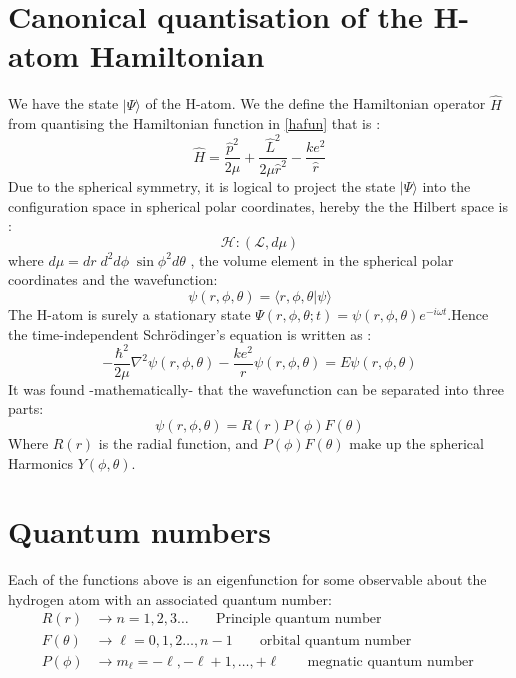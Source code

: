 \section{Canonical quantisation of the H-atom  Hamiltonian }
We have the state $ | \Psi\rangle$ of the H-atom. We the define the Hamiltonian operator $ \hat H$ from quantising the Hamiltonian function in \eqref{hafun} that is :
\begin{equation}
\hat H = \frac{\hat p^2}{2 \mu}+ \frac{\hat L^2}{2\mu \hat r^2} - \frac{k e^2}{\hat r}
\label{haop}
\end{equation}
Due to the spherical symmetry, it is logical to project the state $ | \Psi\rangle$  into the configuration space in spherical polar coordinates, hereby the the Hilbert space is :
\[
\mathcal{H} : ( \mathcal{L} , d\mu)
\]
where $ d\mu = dr\;d^2 d\phi \; \sin\phi ^2 d\theta$ , the volume element in the spherical polar coordinates and the wavefunction:
\[
\psi (r, \phi, \theta) = \langle r, \phi,\theta | \psi \rangle
\]
The H-atom is surely a stationary state $ \Psi(r, \phi, \theta;t) = \psi (r, \phi, \theta) e^{ -i\omega t}$.Hence the time-independent Schr\"{o}dinger's equation is written as :
\begin{equation}
-\frac{\hbar ^2}{2 \mu} \nabla^2 \psi (r, \phi, \theta) - \frac{k e^2}{r} \psi (r, \phi, \theta) = E \psi (r, \phi, \theta)
\label{TISE}
\end{equation}
It was found -mathematically- that the wavefunction can be separated into three parts:
\begin{equation}
\psi (r, \phi, \theta) = R(r) P(\phi)F(\theta)
\end{equation}
Where $R(r)$ is the radial function, and $ P(\phi)F(\theta)$ make up the spherical Harmonics $ Y(\phi,\theta)$.
\section{Quantum numbers}
Each of the functions above is an eigenfunction for some observable about the hydrogen atom with an associated quantum number:
\begin{align*}
R(r) &\longrightarrow n = 1,2,3 \dots\; \; \; \; \; \; \;  \text{Principle quantum number } \\
F(\theta)&\longrightarrow  \ell= 0,1,2\dots, n-1 \; \; \; \; \; \; \;  \text{orbital quantum number } \\
P(\phi)&\longrightarrow m_ \ell= -\ell, -\ell+1,\dots,+\ell \; \; \; \; \; \; \;  \text{megnatic quantum number } 
\end{align*}
